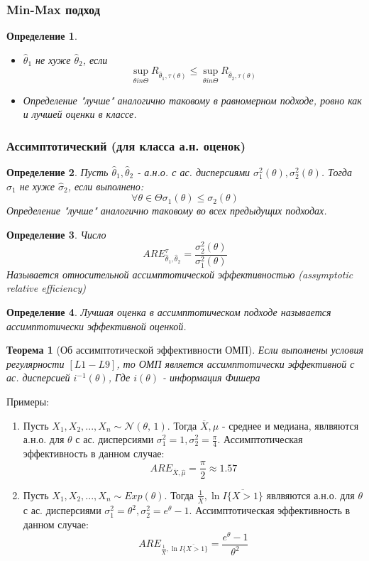 \documentclass[a4paper,12pt]{article}
\newcommand{\normal}[2]{\mathcal{N}(#1,\,#2)}
\newcommand{\sample}{X_1, X_2, ..., X_n}
\newtheorem{dfn}{Определение}[section]
\theoremstyle{named}
\newtheorem*{namedtheorem}{Теорема}
\begin{document}
\subsubsection{Min-Max подход}
\begin{dfn}
    \begin{itemize}
        \item $\hat\theta_1$ не хуже $\hat\theta_2$, если 
        $$
            \sup_{\theta in \Theta} R_{\hat\theta_1, \tau(\theta)} \leq \sup_{\theta in \Theta} R_{\hat\theta_2, \tau(\theta)}
        $$  
        \item Определение "лучше" аналогично таковому в равномерном подходе, ровно как и лучшей оценки в классе. 
    \end{itemize}
\end{dfn}
\subsubsection{Ассимптотический (для класса а.н. оценок)}
\begin{dfn}
    Пусть $\hat\theta_1, \hat\theta_2 $ - а.н.о. с ас. дисперсиями $\sigma_1^2(\theta), \sigma_2^2(\theta)$. Тогда $\hat\sigma_1$ не 
    хуже $\hat\sigma_2$, если выполнено:
    $$
        \forall \theta \in \Theta \sigma_1(\theta) \leq \sigma_2(\theta)
    $$
    Определение "лучше" аналогично таковому во всех предыдущих подходах. 
\end{dfn}
\begin{dfn}
    Число 
    $$
        ARE_{\hat\theta_1, \hat\theta_2}^\tau = \frac{\sigma_2^2(\theta)}{\sigma_1^2(\theta)}
    $$
    Называется относительной ассимптотической эффективностью (assymptotic relative efficiency) 
\end{dfn}
\begin{dfn}
    Лучшая оценка в ассимптотическом подходе называется ассимптотически эффективной оценкой. 
\end{dfn}
\begin{namedtheorem}[Об ассимптотической эффективности ОМП]
    Если выполнены условия регулярности $[L1-L9]$, то ОМП является ассимптотически эффективной с ас. дисперсией $i^{-1}(\theta)$, Где
    $i(\theta)$ - информация Фишера
\end{namedtheorem}
Примеры:
\begin{enumerate}
    \item Пусть $\sample \sim \normal{\theta}{1}$. Тогда $\overline{X}, \hat\mu$ - среднее и медиана, явлвяются а.н.о. для $\theta$
    с ас. дисперсиями $\sigma_1^2 = 1, \sigma_2^2 = \frac{\pi}{4}$. Ассимптотическая эффективность в данном случае:
    $$
        ARE_{\overline{X}, \hat\mu} = \frac{\pi}{2} \approx 1.57
    $$
    \item Пусть $\sample \sim Exp(\theta)$. Тогда $\frac{1}{\overline{X}}, \ln \overline{I \{ X > 1\}}$ явлвяются а.н.о. для $\theta$
    с ас. дисперсиями $\sigma_1^2 = \theta^2, \sigma_2^2 = e^\theta - 1$. Ассимптотическая эффективность в данном случае:
    $$
        ARE_{\frac{1}{\overline{X}}, \ln \overline{I \{ X > 1\}}} = \frac{e^\theta - 1}{\theta^2} 
    $$ 
\end{enumerate}
\end{document}
